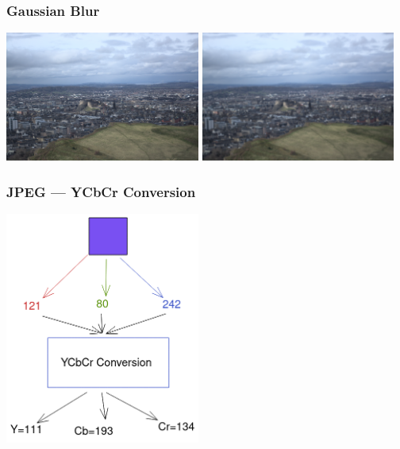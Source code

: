 \documentclass{beamer}
\begin{document}
\begin{frame}
    \frametitle{Gaussian Blur}
    \begin{center}
        \includegraphics[width=0.48\textwidth]{default.png}
        \includegraphics[width=0.48\textwidth]{blur.png}
    \end{center}

\end{frame}

\begin{frame}
    \frametitle{JPEG — YCbCr Conversion}
    \begin{center}
        \includegraphics[width=0.48\textwidth]{ycbcr.png}
    \end{center}
\end{frame}
\end{document}
